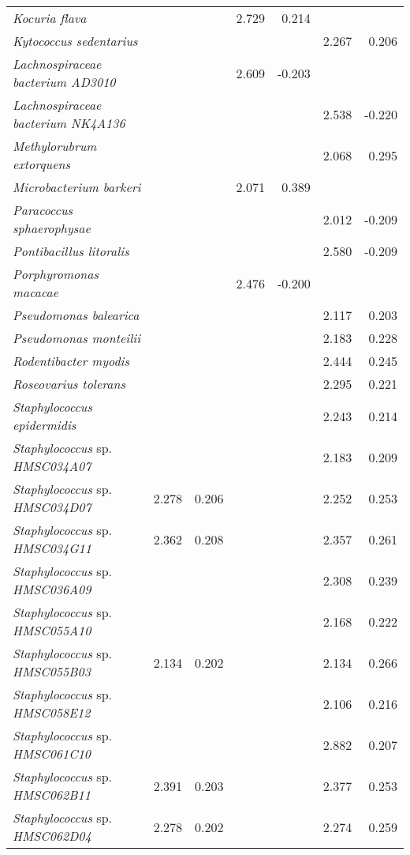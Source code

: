 \begin{longtable}{l|rr|rr|rr}
\textit{Kocuria flava} &  &  & 2.729 & 0.214 &  &  \\
\textit{Kytococcus sedentarius} &  &  &  &  & 2.267 & 0.206 \\
\textit{Lachnospiraceae bacterium AD3010} &  &  & 2.609 & -0.203 &  &  \\
\textit{Lachnospiraceae bacterium NK4A136} &  &  &  &  & 2.538 & -0.220 \\
\textit{Methylorubrum extorquens} &  &  &  &  & 2.068 & 0.295 \\
\textit{Microbacterium barkeri} &  &  & 2.071 & 0.389 &  &  \\
\textit{Paracoccus sphaerophysae} &  &  &  &  & 2.012 & -0.209 \\
\textit{Pontibacillus litoralis} &  &  &  &  & 2.580 & -0.209 \\
\textit{Porphyromonas macacae} &  &  & 2.476 & -0.200 &  &  \\
\textit{Pseudomonas balearica} &  &  &  &  & 2.117 & 0.203 \\
\textit{Pseudomonas monteilii} &  &  &  &  & 2.183 & 0.228 \\
\textit{Rodentibacter myodis} &  &  &  &  & 2.444 & 0.245 \\
\textit{Roseovarius tolerans} &  &  &  &  & 2.295 & 0.221 \\
\textit{Staphylococcus epidermidis} &  &  &  &  & 2.243 & 0.214 \\
\textit{Staphylococcus} sp. \textit{HMSC034A07} &  &  &  &  & 2.183 & 0.209 \\
\textit{Staphylococcus} sp. \textit{HMSC034D07} & 2.278 & 0.206 &  &  & 2.252 & 0.253 \\
\textit{Staphylococcus} sp. \textit{HMSC034G11} & 2.362 & 0.208 &  &  & 2.357 & 0.261 \\
\textit{Staphylococcus} sp. \textit{HMSC036A09} &  &  &  &  & 2.308 & 0.239 \\
\textit{Staphylococcus} sp. \textit{HMSC055A10} &  &  &  &  & 2.168 & 0.222 \\
\textit{Staphylococcus} sp. \textit{HMSC055B03} & 2.134 & 0.202 &  &  & 2.134 & 0.266 \\
\textit{Staphylococcus} sp. \textit{HMSC058E12} &  &  &  &  & 2.106 & 0.216 \\
\textit{Staphylococcus} sp. \textit{HMSC061C10} &  &  &  &  & 2.882 & 0.207 \\
\textit{Staphylococcus} sp. \textit{HMSC062B11} & 2.391 & 0.203 &  &  & 2.377 & 0.253 \\
\textit{Staphylococcus} sp. \textit{HMSC062D04} & 2.278 & 0.202 &  &  & 2.274 & 0.259 \\

\end{longtable}
